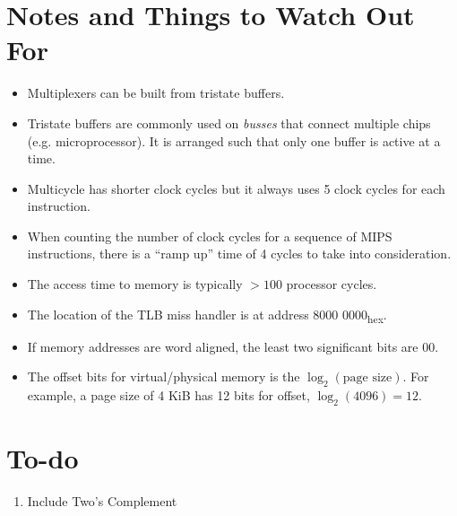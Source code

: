 \documentclass[12pt]{article}
\theoremstyle{definition}
\begin{document}
  \section{Notes and Things to Watch Out For}
  \begin{itemize}
    \item Multiplexers can be built from tristate buffers.
    \item Tristate buffers are commonly used on \emph{busses} that connect multiple chips (e.g. microprocessor).
    It is arranged such that only one buffer is active at a time.
    \item Multicycle has shorter clock cycles but it always uses 5 clock cycles for each instruction.
    \item When counting the number of clock cycles for a sequence of MIPS instructions, there is a ``ramp up'' time of 4 cycles to take into consideration.
    \item The access time to memory is typically $> 100$ processor cycles.
    \item The location of the TLB miss handler is at address 8000 0000\textsubscript{hex}.
    \item If memory addresses are word aligned, the least two significant bits are 00.
    \item The offset bits for virtual/physical memory is the $\log_2(\text{page size})$. For example, a page size of 4 KiB has 12 bits for offset, $\log_2(4096) = 12$.
  \end{itemize}

  \newpage
  \section{To-do}
  \begin{enumerate}
    \item Include Two's Complement
  \end{enumerate}

  \clearpage
  \printindex
\end{document}
